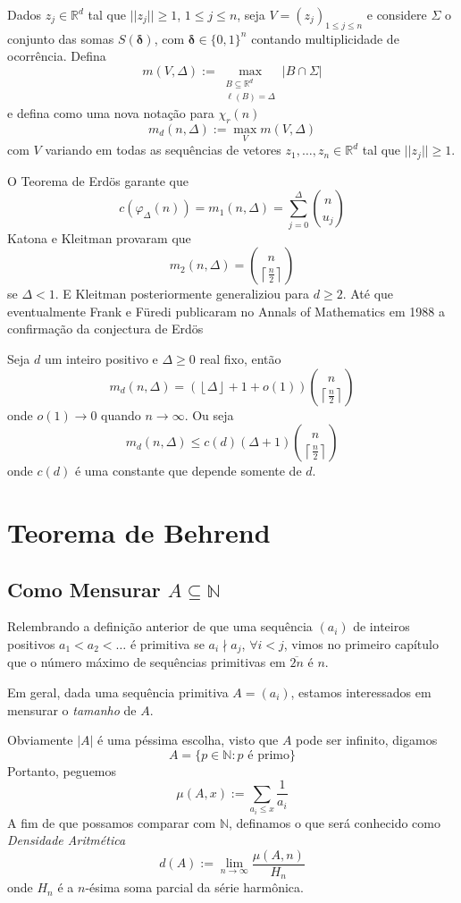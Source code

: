 \documentclass[11pt]{article}
\newcommand{\mbb}[1]{\mathbb{#1}}
\newcommand{\ol}[1]{\overline{#1}}
\newcommand\floor[1]{{\left\lfloor#1\right\rfloor}}
\newcommand\ceil[1]{{\left\lceil#1\right\rceil}}
\newcommand{\cl}[1]{\colorlet{shadecolor}{#1}}
\begin{document}
Dados $z_j\in\mbb{R}^d$ tal que $||z_j||\geq1$, $1\leq j\leq n$, seja $V=(z_j)_{1\leq j\leq n}$ e considere $\Sigma$ o conjunto das somas $S(\boldsymbol{\delta})$, com $\boldsymbol{\delta}\in\{0,1\}^n$ contando multiplicidade de ocorrência. Defina
$$m(V,\Delta):=\max_{\substack{B\subseteq \mbb{R}^d\\\ell(B)=\Delta}}|B\cap\Sigma|$$
e defina como uma nova notação para $\chi_r(n)$
$$m_d(n,\Delta):=\max_{V}m(V,\Delta)$$
com $V$ variando em todas as sequências de vetores $z_1,\dots,z_n\in\mbb{R}^d$ tal que $||z_j||\geq1$.

O Teorema de Erdös garante que
$$c(\varphi_\Delta(n))=m_1(n,\Delta)=\sum_{j=0}^\Delta\binom{n}{u_j}$$
Katona e Kleitman provaram que
$$m_2(n,\Delta)=\binom{n}{\ceil{\frac{n}{2}}}$$
se $\Delta<1$. E Kleitman posteriormente generaliziou para $d\geq2$. Até que eventualmente Frank e Füredi publicaram no Annals of Mathematics em 1988 a confirmação da conjectura de Erdös

\cl{orange!15}
\begin{shaded}
\begin{theorem}
    Seja $d$ um inteiro positivo e $\Delta\geq0$ real fixo, então
    $$m_d(n,\Delta)=(\floor{\Delta}+1+o(1))\binom{n}{\ceil{\frac{n}{2}}}$$
    onde $o(1)\to0$ quando $n\to\infty$. Ou seja
    $$m_d(n,\Delta)\leq c(d)(\Delta+1)\binom{n}{\ceil{\frac{n}{2}}}$$
    onde $c(d)$ é uma constante que depende somente de $d$.
\end{theorem}
\end{shaded}

\section{Teorema de Behrend}

\subsection{Como Mensurar $A\subseteq\mbb{N}$}

Relembrando a definição anterior de que uma sequência $(a_i)$ de inteiros positivos $a_1<a_2<\dots$ é primitiva se $a_i\nmid a_j$, $\forall i<j$, vimos no primeiro capítulo que o número máximo de sequências primitivas em $\ol{2n}$ é $n$.

Em geral, dada uma sequência primitiva $A=(a_i)$, estamos interessados em mensurar o \textit{tamanho} de $A$.

Obviamente $|A|$ é uma péssima escolha, visto que $A$ pode ser infinito, digamos
$$A=\{p\in\mbb{N}:p\text{ é primo}\}$$
Portanto, peguemos
$$\mu(A,x):=\sum_{a_i\leq x}\frac{1}{a_i}$$
A fim de que possamos comparar com $\mbb{N}$, definamos o que será conhecido como \textit{Densidade Aritmética}
$$d(A):=\lim_{n\to\infty}\frac{\mu(A,n)}{H_n}$$
onde $H_n$ é a $n$-ésima soma parcial da série harmônica.
\end{document}
